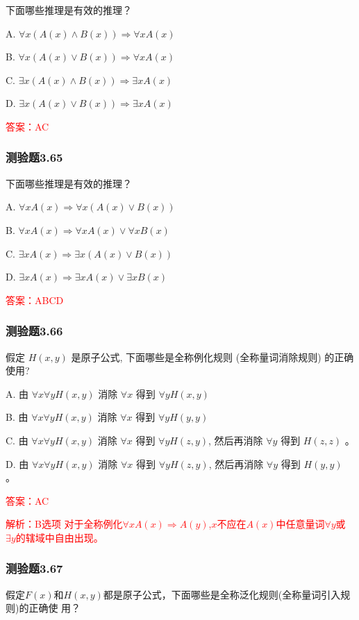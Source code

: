 \documentclass[UTF8, heading=true]{ctexart}
\begin{document}
下面哪些推理是有效的推理？

A. $\forall x(A(x) \wedge B(x)) \Longrightarrow \forall x A(x)$

B. $\forall x(A(x) \vee B(x)) \Longrightarrow \forall x A(x)$

C. $\exists x(A(x) \wedge B(x)) \Longrightarrow \exists x A(x)$

D. $\exists x(A(x) \vee B(x)) \Longrightarrow \exists x A(x)$

\textcolor{red}{答案：AC}

\subsubsection{测验题3.65}

下面哪些推理是有效的推理？

A. $
\forall x A(x) \Longrightarrow \forall x(A(x) \vee B(x))
$

B. $
\forall x A(x) \Longrightarrow \forall x A(x) \vee \forall x B(x)
$

C. $
\exists x A(x) \Longrightarrow \exists x(A(x) \vee B(x))
$

D. $
\exists x A(x) \Longrightarrow \exists x A(x) \vee \exists x B(x)
$

\textcolor{red}{答案：ABCD}


\subsubsection{测验题3.66}

假定 $H(x, y)$ 是原子公式, 下面哪些是全称例化规则 (全称量词消除规则) 的正确使用?

A. 由 $\forall x \forall y H(x, y)$ 消除 $\forall x$ 得到 $\forall y H(x, y)$

B. 由 $\forall x \forall y H(x, y)$ 消除 $\forall x$ 得到 $\forall y H(y, y)$

C.   由 $\forall x \forall y H(x, y)$ 消除 $\forall x$ 得到 $\forall y H(z, y)$, 然后再消除 $\forall y$ 得到 $H(z, z)$ 。

D.  由 $\forall x \forall y H(x, y)$ 消除 $\forall x$ 得到 $\forall y H(z, y)$, 然后再消除 $\forall y$ 得到 $H(y, y)$ 。


\textcolor{red}{答案：AC}

\textcolor{red}{解析：B选项 对于全称例化$\forall x A(x) \Longrightarrow A(y)$,$x$不应在$A(x)$中任意量词$\forall y$或$\exists y$的辖域中自由出现。}


\subsubsection{测验题3.67}
假定$F(x)$和$H(x,y)$都是原子公式，下面哪些是全称泛化规则(全称量词引入规则)的正确使
用？
\end{document}
